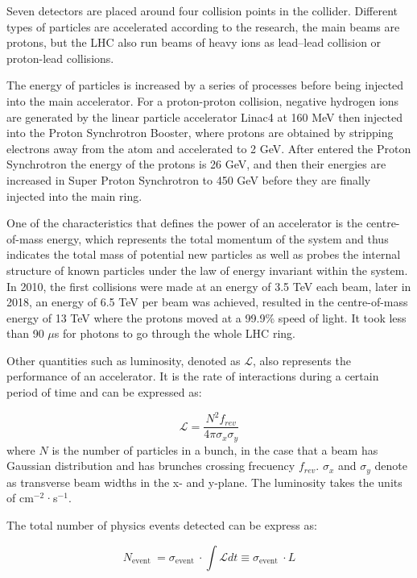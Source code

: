 \documentclass[UTF8,12pt]{ctexart}
\numberwithin{equation}{section}
\begin{document}
 Seven detectors are placed around four collision points in the collider. Different types of particles are accelerated according to the research, the main beams are protons, but the LHC also run beams of heavy ions as lead–lead collision or proton-lead collisions.
 
 The energy of particles is increased by a series of processes before being injected into the main accelerator. For a proton-proton collision, negative hydrogen ions are generated by the linear particle accelerator Linac4 at 160 MeV then injected into the Proton Synchrotron Booster, where protons are obtained by stripping electrons away from the atom and accelerated to 2 GeV. After entered the Proton Synchrotron the energy of the protons is 26 GeV, and then their energies are increased in Super Proton Synchrotron to 450 GeV before they are finally injected into the main ring. 

  
One of the characteristics that defines the power of an accelerator is the centre-of-mass energy, which represents the total momentum of the system and thus indicates the total mass of potential new particles as well as probes the internal structure of known particles under the law of energy invariant within the system. In 2010, the first collisions were made at an energy of 3.5 TeV each beam, later in 2018, an energy of 6.5 TeV per beam was achieved, resulted in the centre-of-mass energy of 13 TeV where the protons moved at a 99.9\% speed of light. It took less than 90 $\mu$s for photons to go through the whole LHC ring. 

Other quantities such as luminosity, denoted as $\mathcal{L}$, also represents the performance of an accelerator. It is the rate of interactions during a certain period of time and can be expressed as:

\begin{equation}
\mathcal{L}=\frac{N^2 f_{r e v}}{4 \pi \sigma_x \sigma_y} 
\end{equation}
where $N$ is the number of particles in a bunch, in the case that a beam has Gaussian distribution and has brunches crossing frecuency $f_{rev}$. $\sigma_x$ and $\sigma_y$ denote as transverse beam widths in the x- and y-plane. The luminosity takes the units of cm$^{-2}$·s$^{-1}$.

The total number of physics events detected can be express as:

\begin{equation}
N_{\text {event }}=\sigma_{\text {event }} \cdot \int \mathcal{L} d t \equiv \sigma_{\text {event }} \cdot L
\end{equation}
\end{document}
